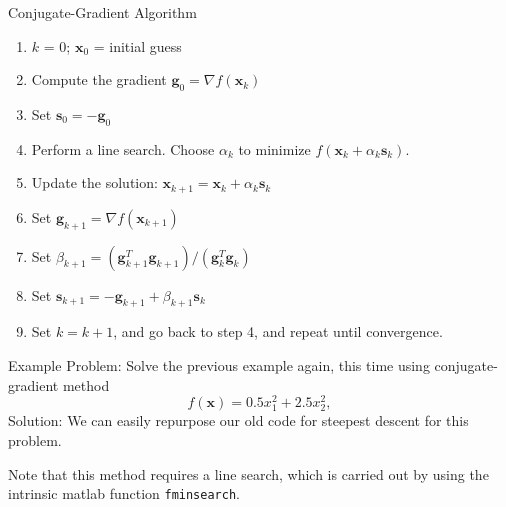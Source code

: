 \documentclass[xcolor=dvipsnames,11pt]{beamer}
\newcommand{\highlight}[1]{\textcolor{BrickRed}{#1}}
\begin{document}
\begin{frame}{Conjugate-Gradient Algorithm}
\begin{enumerate}
\item $k$ = 0; $\mathbf{x}_0$ = initial guess
\item Compute the gradient $\mathbf{g}_0 = \nabla f(\mathbf{x}_k)$
\item Set $\mathbf{s}_0 = -\mathbf{g}_0$
\item Perform a line search. Choose $\alpha_k$ to minimize $f(\mathbf{x}_k + \alpha_k \mathbf{s}_k)$.
\item Update the solution: $\mathbf{x}_{k+1} = \mathbf{x}_k + \alpha_k \mathbf{s}_k$
\item Set $\mathbf{g}_{k+1} = \nabla f(\mathbf{x}_{k+1})$
\item Set $\beta_{k+1} = (\mathbf{g}_{k+1}^T \mathbf{g}_{k+1})/(\mathbf{g}_{k}^T \mathbf{g}_{k})$
\item Set $\mathbf{s}_{k+1} = -\mathbf{g}_{k+1} + \beta_{k+1} \mathbf{s}_k$
\item Set $k = k + 1$, and go back to step 4, and repeat until convergence.
\end{enumerate}
\end{frame}


\begin{frame}{Example}
\highlight{Problem}: Solve the previous example again, this time using conjugate-gradient method
$$f(\mathbf{x}) = 0.5 x_1^2 + 2.5 x_2^2,$$
\highlight{Solution}: We can easily repurpose our old code for steepest descent for this problem.

\medskip

Note that this method requires a line search, which is carried out by using the intrinsic matlab function \texttt{fminsearch}.

\medskip


\end{frame}
\end{document}
